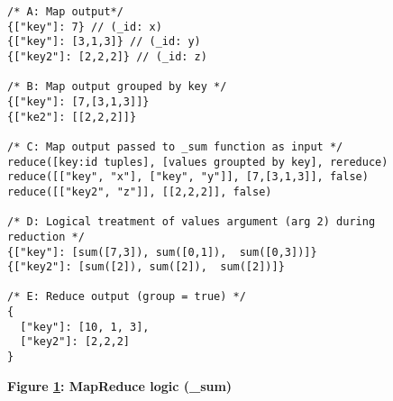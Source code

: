 \begin{figure}[H]
    \centering
    \begin{mdframed}[rightline=true,leftline=true]
        \begin{verbatim}
/* A: Map output*/
{["key"]: 7} // (_id: x)
{["key"]: [3,1,3]} // (_id: y)
{["key2"]: [2,2,2]} // (_id: z)

/* B: Map output grouped by key */
{["key"]: [7,[3,1,3]]}
{["ke2"]: [[2,2,2]]}

/* C: Map output passed to _sum function as input */
reduce([key:id tuples], [values groupted by key], rereduce)
reduce([["key", "x"], ["key", "y"]], [7,[3,1,3]], false)
reduce([["key2", "z"]], [[2,2,2]], false)

/* D: Logical treatment of values argument (arg 2) during reduction */
{["key"]: [sum([7,3]), sum([0,1]),  sum([0,3])]}
{["key2"]: [sum([2]), sum([2]),  sum([2])]}

/* E: Reduce output (group = true) */
{
  ["key"]: [10, 1, 3],
  ["key2"]: [2,2,2]
}
    \end{verbatim}
    \end{mdframed}
    \caption[MapReduce logic (\_sum)]{\textbf{Figure \ref{fig-sum-reduce-fn}: MapReduce logic (\_sum)}}
    \label{fig-sum-reduce-fn}
\end{figure}